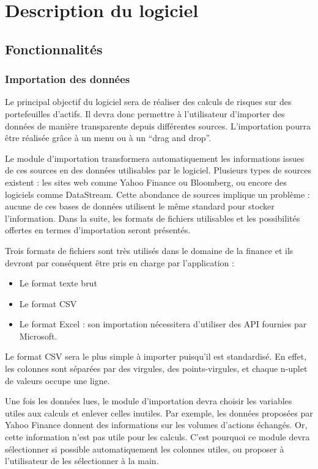 \chapter{Description du logiciel}

\section{Fonctionnalités}

	\subsection{Importation des données}
		Le principal objectif du logiciel sera de réaliser des calculs de risques sur des portefeuilles d'actifs. Il devra donc permettre à l'utilisateur d'importer des données de manière transparente depuis différentes sources. L'importation pourra être réalisée grâce à un menu ou à un “drag and drop”. 

		Le module d'importation transformera automatiquement les informations issues de ces sources en des données utilisables par le logiciel. Plusieurs types de sources existent : les sites web comme Yahoo Finance ou Bloomberg, ou encore des logiciels comme DataStream. Cette abondance de sources implique un problème : aucune de ces bases de données utilisent le même standard pour stocker l'information. Dans la suite, les formats de fichiers utilisables et les possibilités offertes en termes d'importation seront présentés.

		Trois formats de fichiers sont très utilisés dans le domaine de la finance et ils devront par conséquent être pris en charge par l'application :
		\begin{itemize}
			\item Le format texte brut
			\item Le format CSV
			\item Le format Excel : son importation nécessitera d'utiliser des API fournies par Microsoft.
		\end{itemize}

		Le format CSV sera le plus simple à importer puisqu'il est standardisé. En effet, les colonnes sont séparées par des virgules, des points-virgules, et chaque n-uplet de valeurs occupe une ligne.

		Une fois les données lues, le module d'importation devra choisir les variables utiles aux calculs et enlever celles inutiles. Par exemple, les données proposées par Yahoo Finance donnent des informations sur les volumes d'actions échangés. Or, cette information n'est pas utile pour les calculs. C'est pourquoi ce module devra sélectionner si possible automatiquement les colonnes utiles, ou proposer à l'utilisateur de les sélectionner à la main. 

